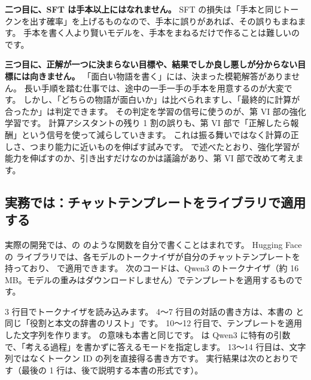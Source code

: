 \textbf{二つ目に、SFT は手本以上にはなれません。}
SFT の損失は「手本と同じトークンを出す確率」を上げるものなので、手本に誤りがあれば、その誤りもまねます。
手本を書く人より賢いモデルを、手本をまねるだけで作ることは難しいのです。

\textbf{三つ目に、正解が一つに決まらない目標や、結果でしか良し悪しが分からない目標には向きません。}
「面白い物語を書く」には、決まった模範解答がありません。
長い手順を踏む仕事では、途中の一手一手の手本を用意するのが大変です。
しかし、「どちらの物語が面白いか」は比べられますし、「最終的に計算が合ったか」は判定できます。
その判定を学習の信号に使うのが、第 VI 部の強化学習です。
計算アシスタントの残り 1 割の誤りも、第 VI 部で「正解したら報酬」という信号を使って減らしていきます。
これは振る舞いではなく計算の正しさ、つまり能力に近いものを伸ばす試みです。
で述べたとおり、強化学習が能力を伸ばすのか、引き出すだけなのかは議論があり、第 VI 部で改めて考えます。

\subsection{実務では：チャットテンプレートをライブラリで適用する}\label{sec:post-hf}

実際の開発では、の  のような関数を自分で書くことはまれです。
Hugging Face の  ライブラリでは、各モデルのトークナイザが自分のチャットテンプレートを持っており、
 で適用できます。
次のコードは、Qwen3 のトークナイザ（約 16 MB。モデルの重みはダウンロードしません）でテンプレートを適用するものです。


3 行目でトークナイザを読み込みます。
4〜7 行目の対話の書き方は、本書の  と同じ「役割と本文の辞書のリスト」です。
10〜12 行目で、テンプレートを適用した文字列を作ります。
 の意味も本書と同じです。
 は Qwen3 に特有の引数で、「考える過程」を書かずに答えるモードを指定します。
13〜14 行目は、文字列ではなくトークン ID の列を直接得る書き方です。
実行結果は次のとおりです（最後の 1 行は、後で説明する本書の形式です）。


